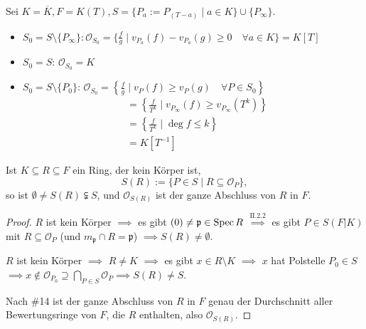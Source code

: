 \begin{beispiel}
    Sei $K = \overline{K}, F = K(T), S = \{P_a := P_{(T-a)} \mid a \in K\} \cup \{P_\infty\}$.
    \begin{itemize}
        \item $S_0 = S \setminus \{P_\infty\}: \mathcal{O}_{S_0} = \{\frac{f}{g} \mid v_{P_a}(f) - v_{P_a}(g) \geq 0 \quad \forall a \in K\} = K[T]$
        \item $S_0 = S$: $\mathcal{O}_{S_0} = K$
        \item $S_0 = S \setminus \{P_0\}$: $\mathcal{O}_{S_0}=\left\{\frac{f}{g} \mid v_P(f) \geq v_P(g) \quad \forall P \in S_0\right\}$
        \begin{align*}
            & = \left\{\frac{f}{T^k} \mid v_{P_\infty} (f) \geq v_{P_\infty}(T^k)\right\}\\
            & = \left\{\frac{f}{T^k} \mid \deg f \leq k\right\}\\
            & = K[T^{-1}]
        \end{align*}
    \end{itemize}
\end{beispiel}

\begin{lemma}
    Ist $K \subseteq R \subseteq F$ ein Ring, der kein Körper ist,
    $$ S(R) := \{P \in S \mid R \subseteq \mathcal{O}_P\},$$
    so ist $\emptyset \ne S(R) \subsetneqq S$, und $\mathcal{O}_{S(R)}$ ist der ganze Abschluss von $R$ in $F$.
\end{lemma}
\begin{proof}
    $R$ ist kein Körper $\implies$ es gibt $(0) \neq \mathfrak{p} \in \operatorname{Spec} R$
    $\stackrel{\text{II.2.2}}{\implies}$ es gibt $P \in S(F|K)$ mit $R \subseteq \mathcal{O}_P$ (und $m_\mathfrak{p} \cap R = \mathfrak{p}$)
    $\implies S(R) \ne \emptyset$.

    $R$ ist kein Körper $\implies$ $R \ne K$ $\implies$ es gibt $x \in R\setminus K$ $\implies$ $x$ hat Polstelle $P_0 \in S$
    $\implies x \notin \mathcal{O}_{P_0} \supseteq \bigcap\limits_{P \in S} \mathcal{O}_P \implies S(R) \ne S$.
    
    Nach \#14 ist der ganze Abschluss von $R$ in $F$ genau der Durchschnitt aller Bewertungsringe von $F$, die $R$ enthalten, also
    $\mathcal{O}_{S(R)}$.
\end{proof}


